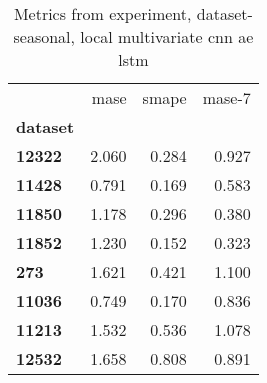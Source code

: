 \begin{table}[h]
\centering
\caption{Metrics from experiment, dataset-seasonal, local multivariate cnn ae lstm}
\label{table:local-multivariate-cnn-ae-lstm-dataset-seasonal}
\begin{tabular}{lrrr}
\toprule
{} &   mase &  smape &  mase-7 \\
\textbf{dataset} &        &        &         \\
\midrule
\textbf{12322  } &  2.060 &  0.284 &   0.927 \\
\textbf{11428  } &  0.791 &  0.169 &   0.583 \\
\textbf{11850  } &  1.178 &  0.296 &   0.380 \\
\textbf{11852  } &  1.230 &  0.152 &   0.323 \\
\textbf{273    } &  1.621 &  0.421 &   1.100 \\
\textbf{11036  } &  0.749 &  0.170 &   0.836 \\
\textbf{11213  } &  1.532 &  0.536 &   1.078 \\
\textbf{12532  } &  1.658 &  0.808 &   0.891 \\
\bottomrule
\end{tabular}
\end{table}
